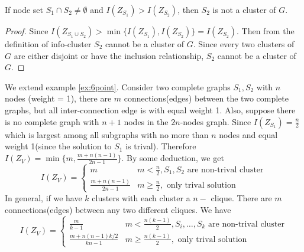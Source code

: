 \documentclass{article}
\begin{document}
\begin{proposition}\label{prop:sub}
If node set $S_1 \cap S_2 \neq \emptyset$ and $I(Z_{S_1}) > I(Z_{S_2})$, then $S_2$ is not a cluster of $G$.
\end{proposition}
\begin{proof}
Since $I(Z_{S_1\cup S_2}) > \min\{I(Z_{S_1}), I(Z_{S_2})\} = I(Z_{S_2})$. Then from the definition of info-cluster $S_2$ cannot be a cluster of $G$.
Since every two clusters of $G$ are either disjoint or have the inclusion relationship, $S_2$ cannot be a cluster of $G$.
\end{proof}
\begin{example}\label{ex:2c}
We extend example \ref{ex:6point}. Consider two complete graphs $S_1, S_2$ with $n$ nodes (weight = 1), there are $m$ connections(edges) between the two complete graphs, but all inter-connection edge is with equal weight 1. Also, suppose there is no complete graph with $n+1$ nodes in the $2n$-nodes graph. Since $I(Z_{S_1})=\frac{n}{2}$ which is largest among all subgraphs with no more than $n$ nodes and equal weight 1(since the solution to $S_1$ is trival). Therefore $I(Z_V) = \min\{m, \frac{m+n(n-1)}{2n-1}\}$. By some deduction, we get
\begin{equation*}
I(Z_V) = \begin{cases}
m & m <\frac{n}{2}, S_1,S_2 \textrm{ are non-trival cluster} \\
\frac{m+n(n-1)}{2n-1} & m\geq \frac{n}{2}, \textrm{ only trival solution} 
\end{cases}
\end{equation*}
In general, if we have $k$ clusters with each cluster a $n-$ clique. There are $m$ connections(edges) between any two different cliques. 
We have
\begin{equation*}
I(Z_V) = \begin{cases}
\frac{m}{k-1} & m <\frac{n(k-1)}{2}, S_i,\dots, S_k \textrm{ are non-trival cluster} \\
\frac{m+n(n-1)k/2}{kn-1} & m\geq \frac{n(k-1)}{2}, \textrm{ only trival solution} 
\end{cases}
\end{equation*}
\end{example}
\end{document}
